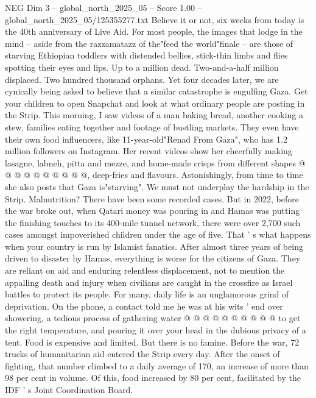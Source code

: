 \begin{textsample}{NEG Dim 3 – global\_north\_2025\_05 – Score 1.00 – global\_north\_2025\_05/125355277.txt}  \label{ex:f3_neg_323}
Believe it or not, six weeks from today is the 40th anniversary of Live Aid.
For most people, the images that lodge in the mind -- aside from the razzamatazz of the"feed the world"finale -- are those of starving Ethiopian toddlers with distended bellies, stick-thin limbs and flies spotting their eyes and lips.
Up to a million dead.
Two-and-a-half million displaced.
Two hundred thousand orphans.
Yet four decades later, we are cynically being asked to believe that a similar catastrophe is engulfing Gaza.
Get your children to open Snapchat and look at what ordinary people are posting in the Strip.
This morning, I saw videos of a man baking bread, another cooking a stew, families eating together and footage of bustling markets.
They even have their own food influencers, like 11-year-old"Renad From Gaza", who has 1.2 million followers on Instagram.
Her recent videos show her cheerfully making lasagne, labneh, pitta and mezze, and home-made crisps from different shapes @ @ @ @ @ @ @ @ @ @, deep-fries and flavours.
Astonishingly, from time to time she also posts that Gaza is"starving".
We must not underplay the hardship in the Strip.
Malnutrition?
There have been some recorded cases.
But in 2022, before the war broke out, when Qatari money was pouring in and Hamas was putting the finishing touches to its 400-mile tunnel network, there were over 2,700 such cases amongst impoverished children under the age of five.
That ' s what happens when your country is run by Islamist fanatics.
After almost three years of being driven to disaster by Hamas, everything is worse for the citizens of Gaza.
They are reliant on aid and enduring relentless displacement, not to mention the appalling death and injury when civilians are caught in the crossfire as Israel battles to protect its people.
For many, daily life is an unglamorous grind of deprivation.
On the phone, a contact told me he was at his wits ' end over showering, a tedious process of gathering water @ @ @ @ @ @ @ @ @ @ to get the right temperature, and pouring it over your head in the dubious privacy of a tent.
Food is expensive and limited.
But there is no famine.
Before the war, 72 trucks of humanitarian aid entered the Strip every day.
After the onset of fighting, that number climbed to a daily average of 170, an increase of more than 98 per cent in volume.
Of this, food increased by 80 per cent, facilitated by the IDF ' s Joint Coordination Board.

\end{textsample}
